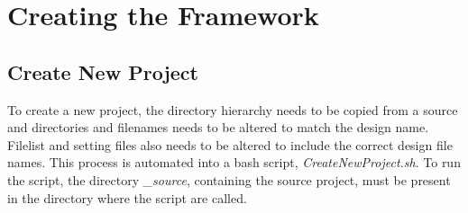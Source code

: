 \chapter{Creating the Framework}
\section{Create New Project}
To create a new project, the directory hierarchy needs to be copied from a source and directories and filenames needs to be altered to match the design name. Filelist and setting files also needs to be altered to include the correct design file names. This process is automated into a bash script, \textit{CreateNewProject.sh}. To run the script, the directory \textit{\_source}, containing the source project, must be present in the directory where the script are called.


